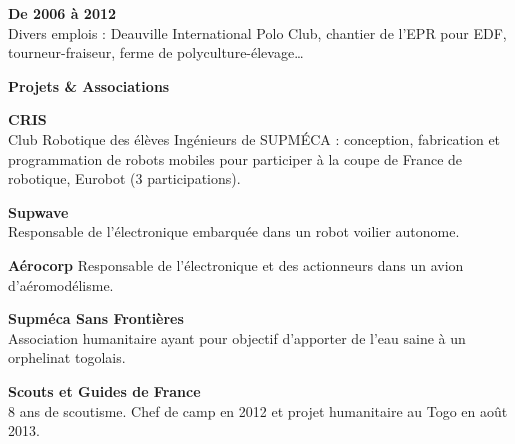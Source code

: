 \documentclass[a4paper,11pt,final]{memoir}
\newcommand{\Sep}{\vspace{1.5em}}
\newcommand{\SmallSep}{\vspace{0.5em}}
\newcommand{\CVSection}[1]
	{\Large\textbf{#1}\par
	\SmallSep\normalsize\normalfont}
\newcommand{\CVItem}[1]
	{\textbf{\color{RoyalBlue} #1}\normalsize\normalfont}
\begin{document}
\CVItem{De 2006 à 2012}\\
Divers emplois : Deauville International Polo Club, chantier de l'EPR pour EDF, tourneur-fraiseur, ferme de polyculture-élevage\ldots
\Sep

\CVSection{Projets \& Associations}
\CVItem{CRIS}\\
Club Robotique des élèves Ingénieurs de SUPMÉCA : conception, fabrication et programmation de robots mobiles pour participer à la coupe de France de robotique, Eurobot (3 participations).
\SmallSep

\CVItem{Supwave}\\
Responsable de l'électronique embarquée dans un robot voilier autonome.
\SmallSep

\CVItem{Aérocorp}
Responsable de l'électronique et des actionneurs dans un avion d'aéromodélisme.
\SmallSep

\CVItem{Supméca Sans Frontières}\\
Association humanitaire ayant pour objectif d'apporter de l'eau saine à un orphelinat togolais.
\SmallSep

\CVItem{Scouts et Guides de France}\\
8 ans de scoutisme. Chef de camp en 2012 et projet humanitaire au Togo en août 2013.

\end{document}
